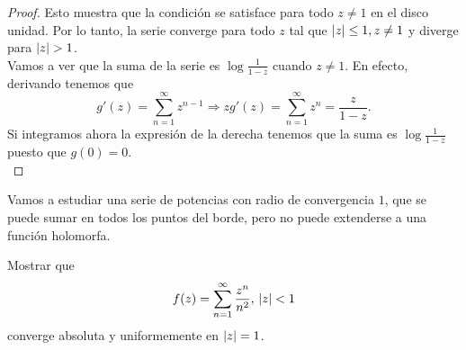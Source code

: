\begin{proof}
    Esto muestra que la condición se satisface para todo $z \not = 1$ en el disco unidad. Por lo tanto, la serie converge para todo $z$ tal que $\left\lvert z\right\rvert \leq 1, z \not = 1$ y diverge para $\left\lvert z\right\rvert > 1$. \\

    Vamos a ver que la suma de la serie es $\log{\frac{1}{1 - z}}$ cuando $z \not = 1$. En efecto, derivando tenemos que
    \begin{equation*}
        g'(z) = \sum_{n=1}^{\infty} z^{n-1} \Rightarrow z g'(z) = \sum_{n=1}^{\infty} z^n = \frac{z}{1 - z}.
     \end{equation*}
     Si integramos ahora la expresión de la derecha tenemos que la suma es $\log{\frac{1}{1 - z}}$ puesto que $g(0) = 0$. \\ %
\end{proof}


Vamos a estudiar una serie de potencias con radio de convergencia $1$, que se puede sumar en todos los puntos del borde, pero no puede extenderse a una función holomorfa. \\

\begin{example}
    Mostrar que
    \begin{equation*}
        f(z) = \sum_{n=1}^{\infty} \frac{z^n}{n^2}, \, \left\lvert z\right\rvert < 1
    \end{equation*}
    converge absoluta y uniformemente en $\left\lvert z\right\rvert = 1$.
\end{example}

